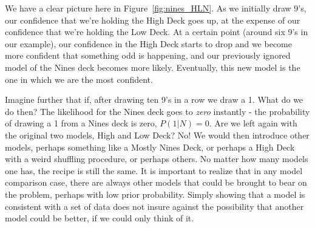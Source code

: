 We have a clear picture here in Figure~\ref{fig:nines_HLN}.  As we initially draw 9's, our confidence that we're holding the High Deck goes up, at the expense of our confidence that we're holding the Low Deck.  At a certain point (around six 9's in our example), our confidence in the High Deck starts to drop and we become more confident that something odd is happening, and our previously ignored model of the Nines deck becomes more likely.  Eventually, this new model is the one in which we are the most confident.  

Imagine further that if, after drawing ten 9's in a row we draw a 1.  What do we do then?  The likelihood for the Nines deck goes to {\em zero} instantly - the probability of drawing a 1 from a Nines deck is zero, $P(1|N)=0$.  Are we left again with the original two models, High and Low Deck?  No!  We would then introduce other models, perhaps something like a Mostly Nines Deck, or perhaps a High Deck with a weird shuffling procedure, or perhaps others.  No matter how many models one has, the recipe is still the same.  It is important to realize that in any model comparison case, there are always other models that could be brought to bear on the problem, perhaps with low prior probability.  Simply showing that a model is consistent with a set of data does not insure against the possibility that another model could be better, if we could only think of it.



